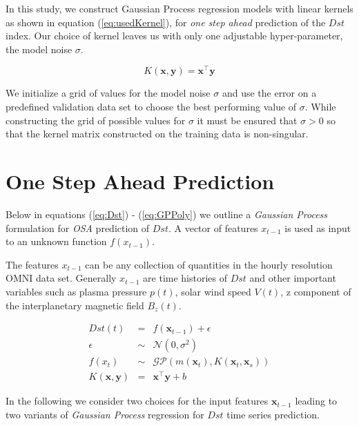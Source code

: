 \documentclass[referee,a4paper,12pt,traditabstract]{swsc}
\begin{document}
\begin{linenumbers}
In this study, we construct Gaussian Process regression models with linear kernels as shown in equation (\ref{eq:usedKernel}), for \emph{one step ahead} prediction of the $Dst$ index. Our choice of kernel leaves us with only one adjustable hyper-parameter, the model noise $\sigma$. 

\begin{equation}\label{eq:usedKernel}
    K(\mathbf{x}, \mathbf{y}) = \mathbf{x}^\intercal \mathbf{y}
\end{equation}

We initialize a grid of values for the model noise $\sigma$ and use the error on a predefined validation data set to choose the best performing value of $\sigma$. While constructing the grid of possible values for $\sigma$ it must be ensured that $\sigma > 0$ so that the kernel matrix constructed on the training data is non-singular.

\section{One Step Ahead Prediction} \label{sec:osa}

Below in equations (\ref{eq:Dst}) - (\ref{eq:GPPoly}) we outline a \emph{Gaussian Process} formulation for \emph{OSA} prediction of $Dst$. A vector of features $x_{t-1}$ is used as input to an unknown function $f(x_{t-1})$.

The features $x_{t-1}$ can be any collection of quantities in the hourly resolution OMNI data set. Generally $x_{t-1}$ are time histories of $Dst$ and other important variables such as plasma pressure $p(t)$, solar wind speed $V(t)$, z component of the interplanetary magnetic field $B_z(t)$.

\begin{eqnarray}
    Dst(t) & = & f(\mathbf{x}_{t-1}) + \epsilon \label{eq:Dst} \\
    \epsilon & \sim & \mathcal{N}(0, \sigma^2) \label{eq:GPNoise} \\
    f(x_t) & \sim & \mathcal{GP}(m(\mathbf{x}_t), K(\mathbf{x}_t, \mathbf{x}_s)) \label{eq:DstGP} \\
    K(\mathbf{x}, \mathbf{y}) & = & \mathbf{x}^\intercal \mathbf{y} + b \label{eq:GPPoly}
\end{eqnarray}

In the following we consider two choices for the input features $\mathbf{x}_{t-1}$ leading to two variants of \emph{Gaussian Process} regression for $Dst$ time series prediction.


\end{linenumbers}
\end{document}

